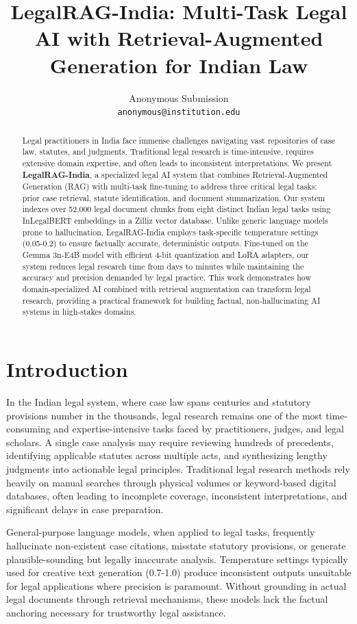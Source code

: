 \documentclass[11pt]{article}
\title{LegalRAG-India: Multi-Task Legal AI with Retrieval-Augmented Generation for Indian Law}
\author{
  Anonymous Submission \\
  \texttt{anonymous@institution.edu}
}
\date{}
\begin{document}
\maketitle

\begin{abstract}
Legal practitioners in India face immense challenges navigating vast repositories of case law, statutes, and judgments. Traditional legal research is time-intensive, requires extensive domain expertise, and often leads to inconsistent interpretations. We present \textbf{LegalRAG-India}, a specialized legal AI system that combines Retrieval-Augmented Generation (RAG) with multi-task fine-tuning to address three critical legal tasks: prior case retrieval, statute identification, and document summarization. Our system indexes over 52,000 legal document chunks from eight distinct Indian legal tasks using InLegalBERT embeddings in a Zilliz vector database. Unlike generic language models prone to hallucination, LegalRAG-India employs task-specific temperature settings (0.05-0.2) to ensure factually accurate, deterministic outputs. Fine-tuned on the Gemma 3n-E4B model with efficient 4-bit quantization and LoRA adapters, our system reduces legal research time from days to minutes while maintaining the accuracy and precision demanded by legal practice. This work demonstrates how domain-specialized AI combined with retrieval augmentation can transform legal research, providing a practical framework for building factual, non-hallucinating AI systems in high-stakes domains.
\end{abstract}

\section{Introduction}

In the Indian legal system, where case law spans centuries and statutory provisions number in the thousands, legal research remains one of the most time-consuming and expertise-intensive tasks faced by practitioners, judges, and legal scholars. A single case analysis may require reviewing hundreds of precedents, identifying applicable statutes across multiple acts, and synthesizing lengthy judgments into actionable legal principles. Traditional legal research methods rely heavily on manual searches through physical volumes or keyword-based digital databases, often leading to incomplete coverage, inconsistent interpretations, and significant delays in case preparation.

General-purpose language models, when applied to legal tasks, frequently hallucinate non-existent case citations, misstate statutory provisions, or generate plausible-sounding but legally inaccurate analysis. Temperature settings typically used for creative text generation (0.7-1.0) produce inconsistent outputs unsuitable for legal applications where precision is paramount. Without grounding in actual legal documents through retrieval mechanisms, these models lack the factual anchoring necessary for trustworthy legal assistance.
\end{document}
